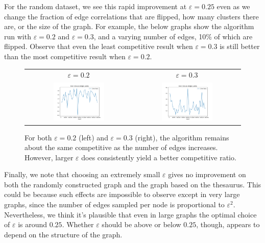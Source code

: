 \documentclass[
]{article}
\begin{document}
For the random dataset, we see this rapid improvement at
  {\(\varepsilon = 0.25\)} even as we change the fraction of edge
correlations that are flipped, how many clusters there are, or the size
of the graph. For example, the below graphs show the algorithm run with
  {\(\varepsilon = 0.2\)} and {\(\varepsilon = 0.3\)}, and a varying
number of edges, 10\% of which are flipped. Observe that even the least
competitive result when $\varepsilon = 0.3$ is still better than the most
competitive result when $\varepsilon = 0.2$.

\begin{figure}[!htb]
  \begin{tabular}{cc}
    {\(\varepsilon  = 0.2\)} & {\(\varepsilon = 0.3\)}                                           \\
    \includegraphics[width=0.5\textwidth]{images/error_ratio_as_edges_varies_eps_equals_0.2.png}
                             &
    \includegraphics[width=0.5\textwidth]{images/error_ratio_as_edges_varies_eps_equals_0.3.png} \\
  \end{tabular}
  \caption{\label{fig:error-ratio-as-edges-varies}
    For both $\varepsilon = 0.2$ (left) and $\varepsilon = 0.3$ (right), the
    algorithm remains about the same competitive as the number of edges
    increases. However, larger $\varepsilon$ does consistently yield
    a better competitive ratio.}
\end{figure}

Finally, we note that choosing an extremely small $\varepsilon$ gives no improvement
on both the randomly constructed graph and the graph based on the thesaurus. This could be
because such effects are impossible to observe except in very large graphs, since the number
of edges sampled per node is proportional to $\varepsilon^2$. Nevertheless, we think it's
plausible that even in large graphs the optimal choice of $\varepsilon$ is around $0.25$.
Whether $\varepsilon$ should be above or below $0.25$, though, appears to depend on the
structure of the graph.
\end{document}

